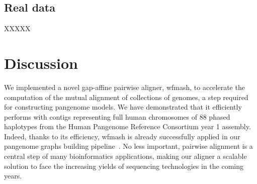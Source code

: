 \documentclass{bioinfo}
\begin{document}
\begin{comment}
\begin{table}[!t]
    \processtable{
        \small
        Performance of pairwise alignment of long sequences from the \textit{Saccharomyces cerevisiae}
        chromosome IV.
        \label{Tab:01}} {
        \begin{tabular}{@{}llllllll@{}}
            \toprule Aligner & Divergence & Length & Runtime (mm:ss) & Memory (GB) & Precision & Sensitivity & F-measure \\
            \midrule
            row1             & row1       & row1   & row1            & row1        & row1      & row1        & row1      \\
            row2             & row2       & row2   & row2            & row1        & row1      & row1        & row1      \\
            row3             & row3       & row3   & row3            & row1        & row1      & row1        & row1      \\
            row4             & row4       & row4   & row4            & row1        & row1      & row1        & row1      \\
            \botrule
        \end{tabular}
    }

\end{table}
\end{comment}




\subsection{Real data}
XXXXX
\\



\section{Discussion}
We implemented a novel gap-affine pairwise aligner, wfmash, to accelerate the computation of the mutual
alignment of collections of genomes, a step required for constructing pangenome models. We have demonstrated that
it efficiently performs with contigs representing full human chromosomes of 88 phased haplotypes from the
Human Pangenome Reference Consortium year 1 assembly. Indeed, thanks to its efficiency, wfmash is already
successfully applied in our pangenome graphs building pipeline~\citep{pggb}. No less important, pairwise
alignment is a central step of many bioinformatics applications, making our aligner a scalable solution to face the
increasing yields of sequencing technologies in the coming years.
\end{document}
